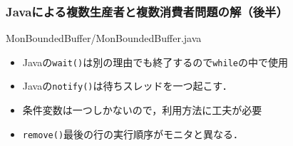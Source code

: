 \documentclass[unicode,handout]{beamer}                   %
\begin{document}
\begin{frame}
  \frametitle{Javaによる複数生産者と複数消費者問題の解（後半）}
      {MonBoundedBuffer/MonBoundedBuffer.java}

  \begin{itemize}
  \item Javaの{\tt wait()}は別の理由でも終了するので{\tt while}の中で使用
  \item Javaの{\tt notify()}は待ちスレッドを一つ起こす．
  \item 条件変数は一つしかないので，利用方法に工夫が必要
  \item {\tt remove()}最後の行の実行順序がモニタと異なる．
  \end{itemize}
\end{frame}
\end{document}
